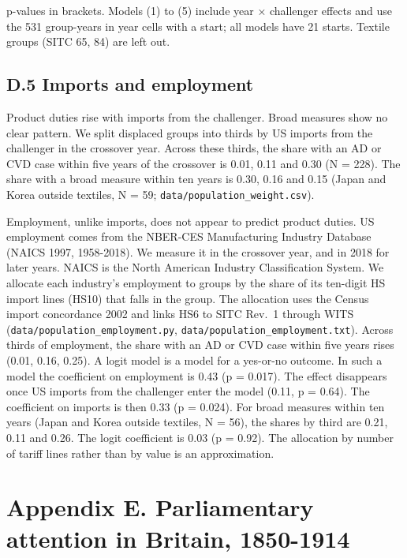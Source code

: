 p-values in brackets. Models (1) to (5) include year × challenger
effects and use the 531 group-years in year cells with a start; all
models have 21 starts. Textile groups (SITC 65, 84) are left out.

\hypertarget{d.5-imports-and-employment}{%
\subsection*{D.5 Imports and
employment}\label{d.5-imports-and-employment}}

Product duties rise with imports from the challenger. Broad measures
show no clear pattern. We split displaced groups into thirds by US
imports from the challenger in the crossover year. Across these thirds,
the share with an AD or CVD case within five years of the crossover is
0.01, 0.11 and 0.30 (N = 228). The share with a broad measure within ten
years is 0.30, 0.16 and 0.15 (Japan and Korea outside textiles, N = 59;
\texttt{data/\allowbreak{}population\_\allowbreak{}weight.csv}).

Employment, unlike imports, does not appear to predict product duties.
US employment comes from the NBER-CES Manufacturing Industry Database
(NAICS 1997, 1958-2018). We measure it in the crossover year, and in
2018 for later years. NAICS is the North American Industry
Classification System. We allocate each industry's employment to groups
by the share of its ten-digit HS import lines (HS10) that falls in the
group. The allocation uses the Census import concordance 2002 and links
HS6 to SITC Rev.~1 through WITS
(\texttt{data/\allowbreak{}population\_\allowbreak{}employment.py},
\texttt{data/\allowbreak{}population\_\allowbreak{}employment.txt}). Across thirds of employment,
the share with an AD or CVD case within five years rises (0.01, 0.16,
0.25). A logit model is a model for a yes-or-no outcome. In such a model
the coefficient on employment is 0.43 (p = 0.017). The effect disappears
once US imports from the challenger enter the model (0.11, p = 0.64).
The coefficient on imports is then 0.33 (p = 0.024). For broad measures
within ten years (Japan and Korea outside textiles, N = 56), the shares
by third are 0.21, 0.11 and 0.26. The logit coefficient is 0.03 (p =
0.92). The allocation by number of tariff lines rather than by value is
an approximation.

\hypertarget{e.-parliamentary-attention-in-britain-1850-1914}{%
\section*{Appendix E. Parliamentary attention in Britain,
1850-1914}\label{e.-parliamentary-attention-in-britain-1850-1914}}

